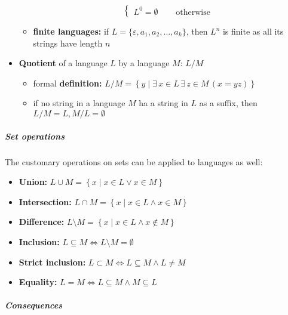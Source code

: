 \documentclass[english]{article}
\begin{document}
\begin{itemize}
\begin{itemize}
\[\begin{cases}
                    L ^ 0 = \emptyset \quad           & \text{ otherwise }
                  \end{cases}\]
          \item \textbf{finite languages:} if \(L = \{\varepsilon, a_1, a_2, \ldots, a_k\}\), then \(L^n\) is finite as all its strings have length \(n\)
        \end{itemize}
  \item \textbf{Quotient} of a language \(L\) by a language \(M\): \(L / M\)
        \begin{itemize}
          \item formal \textbf{definition:} \(L / M = \left\{y \mid \exists \, x \in L \, \exists \, z \in M \, (x = yz) \right\}\)
          \item if no string in a language \(M\) ha a string in \(L\) as a suffix, then \(L / M = L, M / L = \emptyset\)
        \end{itemize}
\end{itemize}

\subparagraph*{Set operations}

The customary operations on sets can be applied to languages as well:

\begin{itemize}
  \item \textbf{Union:} \(L \cup M = \left\{x \mid x \in L \lor x \in M \right\}\)
  \item \textbf{Intersection:} \(L \cap M = \left\{x \mid x \in L \land x \in M \right\}\)
  \item \textbf{Difference:} \(L \setminus M = \left\{x \mid x \in L \land x \notin M \right\}\)
  \item \textbf{Inclusion:} \(L \subseteq M \Leftrightarrow L \setminus M = \emptyset\)
  \item \textbf{Strict inclusion:} \(L \subset M \Leftrightarrow L \subseteq M \land L \neq M\)
  \item \textbf{Equality:} \(L = M \Leftrightarrow L \subseteq M \land M \subseteq L\)
\end{itemize}

\subparagraph*{Consequences}
\end{document}
